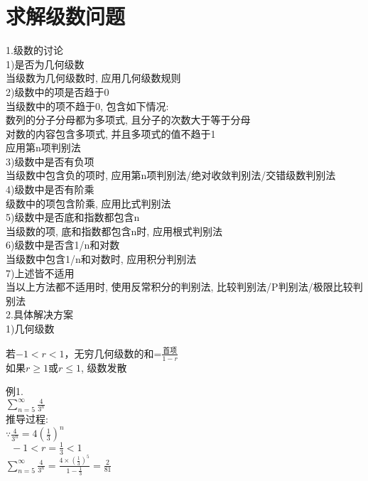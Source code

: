 \chapter{求解级数问题}
1.级数的讨论\\
1)是否为几何级数\\
\phantom{\quad}当级数为几何级数时, 应用几何级数规则\\
2)级数中的项是否趋于0\\
\phantom{\quad}当级数中的项不趋于0, 包含如下情况:\\
\phantom{\qquad}数列的分子分母都为多项式, 且分子的次数大于等于分母\\
\phantom{\qquad}对数的内容包含多项式, 并且多项式的值不趋于1\\
\phantom{\quad}应用第n项判别法\\
3)级数中是否有负项\\
\phantom{\quad}当级数中包含负的项时, 应用第n项判别法/绝对收敛判别法/交错级数判别法\\
4)级数中是否有阶乘\\
\phantom{\quad}级数中的项包含阶乘, 应用比式判别法\\
5)级数中是否底和指数都包含n\\
\phantom{\quad}当级数的项, 底和指数都包含n时, 应用根式判别法\\
6)级数中是否含1/n和对数\\
\phantom{\quad}当级数中包含1/n和对数时, 应用积分判别法\\
7)上述皆不适用\\
\phantom{\quad}当以上方法都不适用时, 使用反常积分的判别法, 比较判别法/P判别法/极限比较判别法\\[2ex]

2.具体解决方案\\
1)几何级数
{\par\centering
\begin{boxedminipage}{8cm}
若$-1<r<1$，无穷几何级数的和=$\displaystyle\frac{\text{首项}}{1-r}$\\
如果$r\geqslant 1$或$r\leqslant 1$, 级数发散
\end{boxedminipage}
\par}

例1.\\
\phantom{例}$\displaystyle\sum_{n=5}^{\infty}\frac{4}{3^n}$\\
推导过程:\\
$\displaystyle\because\frac{4}{3^n}=4(\frac{1}{3})^n$\\
$\displaystyle\phantom{\because}-1<r=\frac{1}{3}<1$\\
$\displaystyle\sum_{n=5}^{\infty}\frac{4}{3^n}=\frac{4\times(\frac{1}{3})^5}{1-\frac{1}{3}}=\frac{2}{81}$\\[1ex]

